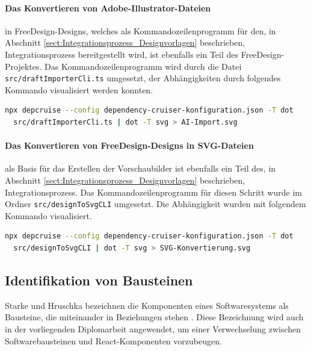 \paragraph{Das Konvertieren von Adobe-Illustrator-Dateien} in FreeDesign-Designs, welches als Kommandozeilenprogramm für den, in Abschnitt \ref{sect:Integrationsprozess_Designvorlagen} beschrieben, Integrationsprozess bereitgestellt wird, ist ebenfalls ein Teil des FreeDesign-Projektes. 
Das Kommandozeilenprogramm wird durch die Datei \lstinline|src/draftImporterCli.ts| umgesetzt, der Abhängigkeiten durch folgendes Kommando visualisiert werden konnten.
\begin{lstlisting}[language={sh}, label=depcruise-draft-import, caption=Visualisierung der Abhängigkeiten des Programms zum Import der AI-Dateien]
npx depcruise --config dependency-cruiser-konfiguration.json -T dot 
  src/draftImporterCli.ts | dot -T svg > AI-Import.svg
\end{lstlisting}

\paragraph{Das Konvertieren von FreeDesign-Designs in SVG-Dateien} als Basis für das Erstellen der Vorschaubilder ist ebenfalls ein Teil des, in Abschnitt \ref{sect:Integrationsprozess_Designvorlagen} beschrieben, Integrationsprozess.  
Das Kommandozeilenprogramm für diesen Schritt wurde im Ordner \lstinline|src/designToSvgCLI| umgesetzt. Die Abhängigkeit wurden mit folgendem Kommando visualisiert.
\begin{lstlisting}[language={sh}, label=depcruise-draft-import, caption=Visualisierung des Kommandozeilenprogramms designToSvgCLI]
npx depcruise --config dependency-cruiser-konfiguration.json -T dot 
  src/designToSvgCLI | dot -T svg > SVG-Konvertierung.svg
\end{lstlisting}



\subsection{Identifikation von Bausteinen}
Starke und Hruschka bezeichnen die Komponenten eines Softwaresystems als Bausteine, die miteinander in Beziehungen stehen \autocite[vgl.][24]{Starke2011}. Diese Bezeichnung wird auch in der vorliegenden Diplomarbeit angewendet, um einer Verwechselung zwischen Softwarebausteinen und React-Komponenten vorzubeugen.

